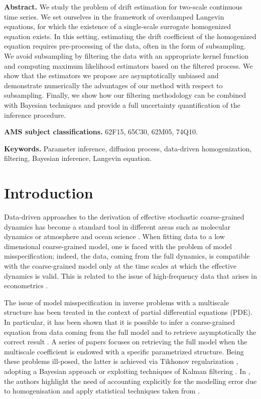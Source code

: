 \documentclass[10pt]{article}
\begin{document}
\maketitle	

\textbf{Abstract.} We study the problem of drift estimation for two-scale continuous time series. We set ourselves in the framework of overdamped Langevin equations, for which the existence of a single-scale surrogate homogenized equation exists. In this setting, estimating the drift coefficient of the homogenized equation requires pre-processing of the data, often in the form of subsampling. We avoid subsampling by filtering the data with an appropriate kernel function and computing maximum likelihood estimators based on the filtered process. We show that the estimators we propose are asymptotically unbiased and demonstrate numerically the advantages of our method with respect to subsampling. Finally, we show how our filtering methodology can be combined with Bayesian techniques and provide a full uncertainty quantification of the inference procedure.
 
\textbf{AMS subject classifications.} 62F15, 65C30, 62M05, 74Q10.

\textbf{Keywords.} Parameter inference, diffusion process, data-driven homogenization, filtering, Bayesian inference, Langevin equation.

\section{Introduction}

Data-driven approaches to the derivation of effective stochastic coarse-grained dynamics has become a standard tool in different areas such as molecular dynamics or atmosphere and ocean science \cite{KKP15,CoP09,YMV19}. When fitting data to a low dimensional coarse-grained model, one is faced with the problem of model misspecification; indeed, the data, coming from the full dynamics, is compatible with the coarse-grained model only at the time scales at which the effective dynamics is valid. This is related to the issue of high-frequency data that arises in econometrics \cite{AiJ14,AMZ05,ZMA05,OSP10}. 

The issue of model misspecification in inverse problems with a multiscale structure has been treated in the context of partial differential equations (PDE). In particular, it has been shown that it is possible to infer a coarse-grained equation from data coming from the full model and to retrieve asymptotically the correct result \cite{NPS12}. A series of papers \cite{AbD18, AbD19, AGZ19} focuses on retrieving the full model when the multiscale coefficient is endowed with a specific parametrized structure. Being these problems ill-posed, the latter is achieved via Tikhonov regularization \cite{AbD19,NPS12}, adopting a Bayesian approach \cite{AbD18, NPS12} or exploiting techniques of Kalman filtering \cite{AGZ19}. In \cite{AbD18,AGZ19}, the authors highlight the need of accounting explicitly for the modelling error due to homogenisation and apply statistical techniques taken from \cite{CDS18,CES14}.
\end{document}
